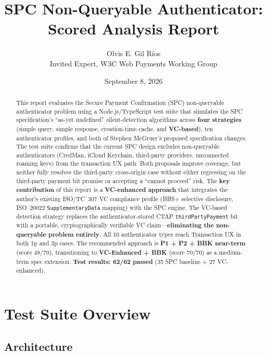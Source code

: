 \documentclass[12pt,a4paper]{article}
\title{\Large\bfseries SPC Non-Queryable Authenticator:\\Scored Analysis Report}
\author{Olvis E. Gil Ríos \\ \small Invited Expert, W3C Web Payments Working Group}
\date{September 8, 2026}
\begin{document}
\maketitle
\thispagestyle{empty}

\begin{abstract}
\noindent
This report evaluates the Secure Payment Confirmation (SPC) non-queryable authenticator problem using a Node.js/TypeScript test suite that simulates the SPC specification's ``as-yet undefined'' silent-detection algorithms across \textbf{four strategies} (simple query, simple response, creation-time cache, and \textbf{VC-based}), ten authenticator profiles, and both of Stephen McGruer's proposed specification changes. The test suite confirms that the current SPC design excludes non-queryable authenticators (CredMan, iCloud Keychain, third-party providers, unconnected roaming keys) from the transaction UX path. Both proposals improve coverage, but neither fully resolves the third-party cross-origin case without either regressing on the third-party payment bit promise or accepting a ``cannot proceed'' risk. The \textbf{key contribution} of this report is a \textbf{VC-enhanced approach} that integrates the author's existing ISO/TC~307 VC compliance profile (BBS+ selective disclosure, ISO~20022 \texttt{SupplementaryData} mapping) with the SPC engine. The VC-based detection strategy replaces the authenticator-stored CTAP \texttt{thirdPartyPayment} bit with a portable, cryptographically verifiable VC claim---\textbf{eliminating the non-queryable problem entirely}. All 10 authenticator types reach Transaction UX in both 1p and 3p cases. The recommended approach is \textbf{P1 + P2 + BBK near-term} (score 48/70), transitioning to \textbf{VC-Enhanced + BBK} (score 70/70) as a medium-term spec extension. \textbf{Test results: 62/62 passed} (35 SPC baseline + 27 VC-enhanced).
\end{abstract}

\tableofcontents
\newpage

\section{Test Suite Overview}

\subsection{Architecture}
\end{document}
